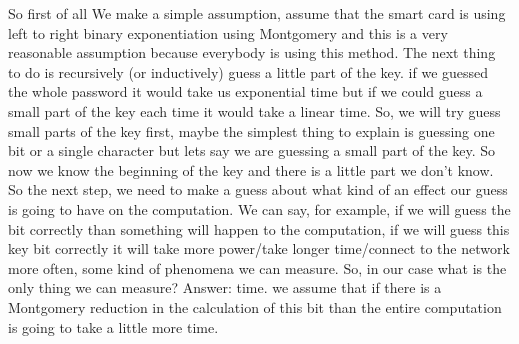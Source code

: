So first of all We make a simple assumption, assume that the smart card is using left to right binary exponentiation using Montgomery and this is a very reasonable assumption because everybody is using this method. The next thing to do is recursively (or inductively) guess a little part of the key. if we guessed the whole password it would take us exponential time but if we could guess a small part of the key each time it would take a linear time. So, we will try guess small parts of the key first, maybe the simplest thing to explain is guessing one bit or a single character but lets say we are guessing a small part of the key. So now we know the beginning of the key and there is a little part we don't know. So the next step, we need to make a guess about what kind of an effect our guess is going to have on the computation. We can say, for example, if we will guess the bit correctly than something will happen to the computation, if we will guess this key bit correctly it will take more power/take longer time/connect to the network more often, some kind of phenomena we can measure. So, in our case what is the only thing we can measure? Answer: time. we assume that if there is a Montgomery reduction in the calculation of this bit than the entire computation is going to take a little more time.


